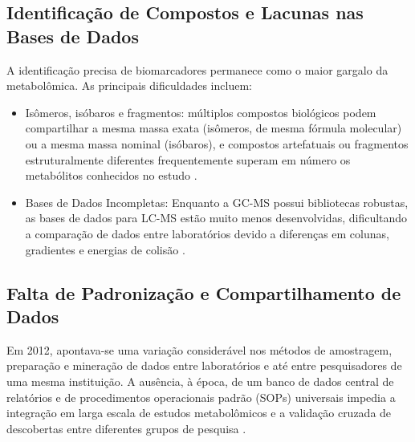 \subsection{Identificação de Compostos e Lacunas nas Bases de Dados}

A identificação precisa de biomarcadores permanece como o maior gargalo da metabolômica. As principais dificuldades incluem:
\begin{itemize}
    \item Isômeros, isóbaros e fragmentos: múltiplos compostos biológicos podem compartilhar a mesma massa exata (isômeros, de mesma fórmula molecular) ou a mesma massa nominal (isóbaros), e compostos artefatuais ou fragmentos estruturalmente diferentes frequentemente superam em número os metabólitos conhecidos no estudo \cite{jong2018challenges}.
\end{itemize}

\begin{itemize}
    \item Bases de Dados Incompletas: Enquanto a GC-MS possui bibliotecas robustas, as bases de dados para LC-MS estão muito menos desenvolvidas, dificultando a comparação de dados entre laboratórios devido a diferenças em colunas, gradientes e energias de colisão \cite{johnson2012challenges}.
\end{itemize}

\subsection{Falta de Padronização e Compartilhamento de Dados }

Em 2012, apontava-se uma variação considerável nos métodos de amostragem, preparação e mineração de dados entre laboratórios e até entre pesquisadores de uma mesma instituição. A ausência, à época, de um banco de dados central de relatórios e de procedimentos operacionais padrão (SOPs) universais impedia a integração em larga escala de estudos metabolômicos e a validação cruzada de descobertas entre diferentes grupos de pesquisa \cite{johnson2012challenges}.